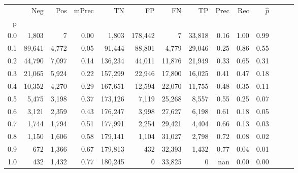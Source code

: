 \begin{tabular}{rrrrrrrrrrrrrr}
\toprule
{} &     Neg &    Pos & mPrec &       TN &       FP &      FN &      TP &  Prec &   Rec & $\hat{p}$ \\
p   &         &        &       &          &          &         &         &       &       &           \\
\midrule
0.0 &   1,803 &      7 &  0.00 &    1,803 &  178,442 &       7 &  33,818 &  0.16 &  1.00 &      0.99 \\
0.1 &  89,641 &  4,772 &  0.05 &   91,444 &   88,801 &   4,779 &  29,046 &  0.25 &  0.86 &      0.55 \\
0.2 &  44,790 &  7,097 &  0.14 &  136,234 &   44,011 &  11,876 &  21,949 &  0.33 &  0.65 &      0.31 \\
0.3 &  21,065 &  5,924 &  0.22 &  157,299 &   22,946 &  17,800 &  16,025 &  0.41 &  0.47 &      0.18 \\
0.4 &  10,352 &  4,270 &  0.29 &  167,651 &   12,594 &  22,070 &  11,755 &  0.48 &  0.35 &      0.11 \\
0.5 &   5,475 &  3,198 &  0.37 &  173,126 &    7,119 &  25,268 &   8,557 &  0.55 &  0.25 &      0.07 \\
0.6 &   3,121 &  2,359 &  0.43 &  176,247 &    3,998 &  27,627 &   6,198 &  0.61 &  0.18 &      0.05 \\
0.7 &   1,744 &  1,794 &  0.51 &  177,991 &    2,254 &  29,421 &   4,404 &  0.66 &  0.13 &      0.03 \\
0.8 &   1,150 &  1,606 &  0.58 &  179,141 &    1,104 &  31,027 &   2,798 &  0.72 &  0.08 &      0.02 \\
0.9 &     672 &  1,366 &  0.67 &  179,813 &      432 &  32,393 &   1,432 &  0.77 &  0.04 &      0.01 \\
1.0 &     432 &  1,432 &  0.77 &  180,245 &        0 &  33,825 &       0 &   nan &  0.00 &      0.00 \\
\bottomrule
\end{tabular}
